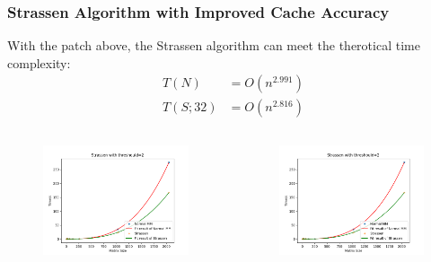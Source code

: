 \documentclass[cjk]{beamer}
\begin{document}
\begin{frame}
  \frametitle{Strassen Algorithm with Improved Cache Accuracy}
  With the patch above, the Strassen algorithm can meet the therotical time complexity:
  \begin{equation}
    \begin{aligned}
      T(N)    & =O(n^{2.991}) \\
      T(S;32) & =O(n^{2.816})
    \end{aligned}
  \end{equation}
  \begin{columns}
    \begin{figure}[htb]
      \includegraphics[width=0.8\linewidth]{th=32_ijk.png}
    \end{figure}
    \begin{figure}[htb]
      \includegraphics[width=0.8\linewidth]{th=64_ijk.png}
    \end{figure}
  \end{columns}
\end{frame}
\end{document}
